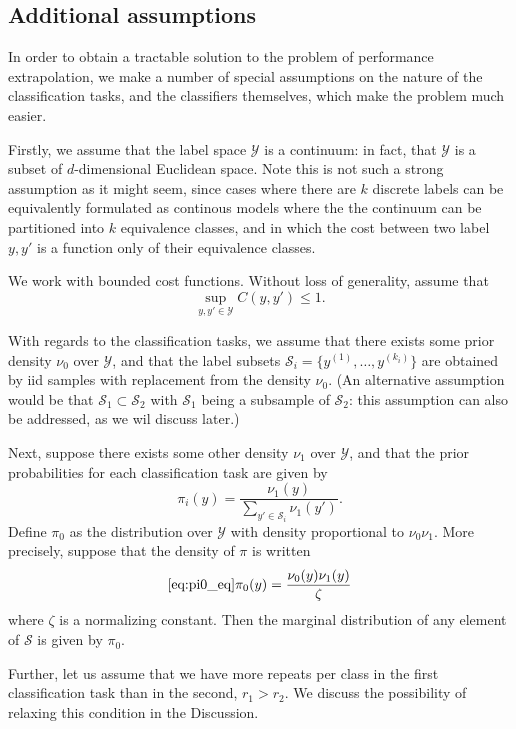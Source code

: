 \documentclass[12pt]{article}
\begin{document}
\subsection{Additional assumptions}

In order to obtain a tractable solution to the problem of performance
extrapolation, we make a number of special assumptions on the nature
of the classification tasks, and the classifiers themselves, which
make the problem much easier.

Firstly, we assume that the label space $\mathcal{Y}$ is a continuum:
in fact, that $\mathcal{Y}$ is a subset of $d$-dimensional Euclidean
space. Note this is not such a strong assumption as it might seem,
since cases where there are $k$ discrete labels can be equivalently
formulated as continous models where the the continuum can be
partitioned into $k$ equivalence classes, and in which the cost
between two label $y, y'$ is a function only of their equivalence
classes.

We work with bounded cost functions.  Without loss of generality,
assume that
\[
\sup_{y, y'\in \mathcal{Y}} C(y, y') \leq 1.
\]

With regards to the classification tasks, we assume that there exists
some prior density $\nu_0$ over $\mathcal{Y}$,
and that the label subsets $\mathcal{S}_i = \{y^{(1)}, \hdots,
y^{(k_i)}\}$ are obtained by iid samples with replacement from the density $\nu_0$.
(An alternative assumption would be that $\mathcal{S}_1 \subset
\mathcal{S}_2$ with $\mathcal{S}_1$ being a subsample of
$\mathcal{S}_2$: this assumption can also be addressed, as we wil
discuss later.)

Next, suppose there exists some other density $\nu_1$ over
$\mathcal{Y}$, and that the prior probabilities for each
classification task are given by
\[
\pi_i(y) = \frac{\nu_1(y)}{\sum_{y' \in \mathcal{S}_i} \nu_1(y')}.
\]
Define $\pi_0$ as the distribution over $\mathcal{Y}$ with density
proportional to $\nu_0 \nu_1$. More precisely, suppose that the density of $\pi$ is written
\begin{equation}\eqref{eq:pi0_eq}
\pi_0(y) = \frac{\nu_0(y) \nu_1(y)}{\zeta}
\end{equation}
where $\zeta$ is a normalizing constant.
Then the marginal distribution of any
element of $\mathcal{S}$ is given by $\pi_0$.

Further, let us assume that we have more repeats per class in the
first classification task than in the second, $r_1 > r_2$.  We discuss
the possibility of relaxing this condition in the Discussion.
\end{document}
